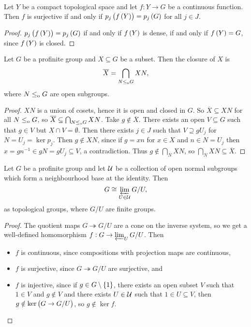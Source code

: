 \begin{corollary}
\label{cor:1.2.31}
Let $ Y $ be a compact topological space and let $ f : Y \to G $ be a continuous function. Then $ f $ is surjective if and only if $ p_j\br{f\br{Y}} = p_j\br{G} $ for all $ j \in J $.
\end{corollary}

\begin{proof}
$ p_j\br{f\br{Y}} = p_j\br{G} $ if and only if $ f\br{Y} $ is dense, if and only if $ f\br{Y} = G $, since $ f\br{Y} $ is closed.
\end{proof}

\pagebreak

\begin{proposition}
\label{prop:1.2.32}
Let $ G $ be a profinite group and $ X \subseteq G $ be a subset. Then the closure of $ X $ is
$$ \overline{X} = \bigcap_{N \le_{\mathrm{o}} G} XN, $$
where $ N \le_{\mathrm{o}} G $ are open subgroups.
\end{proposition}

\begin{proof}
$ XN $ is a union of cosets, hence it is open and closed in $ G $. So $ \overline{X} \subseteq XN $ for all $ N \le_{\mathrm{o}} G $, so $ \overline{X} \subseteq \bigcap_{N \le_{\mathrm{o}} G} XN $. Take $ g \notin \overline{X} $. There exists an open $ V \subseteq G $ such that $ g \in V $ but $ X \cap V = \emptyset $. Then there exists $ j \in J $ such that $ V \supseteq gU_j $ for $ N = U_j = \ker p_j $. Then $ g \notin XN $, since if $ g = xn $ for $ x \in X $ and $ n \in N = U_j $ then $ x = gn^{-1} \in gN = gU_j \subseteq V $, a contradiction. Thus $ g \notin \bigcap_N XN $, so $ \bigcap_N XN \subseteq \overline{X} $.
\end{proof}

\begin{proposition}
\label{prop:1.2.33}
Let $ G $ be a profinite group and let $ \mathcal{U} $ be a collection of open normal subgroups which form a neighbourhood base at the identity. Then
$$ G \cong \varprojlim_{U \in \mathcal{U}} G / U, $$
as topological groups, where $ G / U $ are finite groups.
\end{proposition}

\begin{proof}
The quotient maps $ G \twoheadrightarrow G / U $ are a cone on the inverse system, so we get a well-defined homomorphism $ f : G \to \varprojlim_U G / U $. Then
\begin{itemize}
\item $ f $ is continuous, since compositions with projection maps are continuous,
\item $ f $ is surjective, since $ G \twoheadrightarrow G / U $ are surjective, and
\item $ f $ is injective, since if $ g \in G \setminus \cbr{1} $, there exists an open subset $ V $ such that $ 1 \in V $ and $ g \notin V $ and there exists $ U \in \mathcal{U} $ such that $ 1 \in U \subseteq V $, then $ g \notin \ker \br{G \to G / U} $, so $ g \notin \ker f $.
\end{itemize}
\end{proof}

